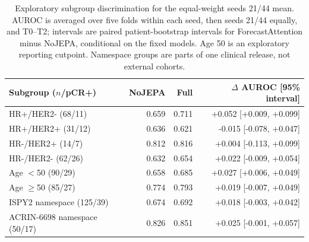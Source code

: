 \begin{table}[t]
\centering
\small
\caption{Exploratory subgroup discrimination for the equal-weight seeds 21/44 mean. AUROC is averaged over five folds within each seed, then seeds 21/44 equally, and T0--T2; intervals are paired patient-bootstrap intervals for ForecastAttention minus NoJEPA, conditional on the fixed models. Age 50 is an exploratory reporting cutpoint. Namespace groups are parts of one clinical release, not external cohorts.}
\label{tab:subgroups}
\begin{tabular}{lrrr}
\toprule
Subgroup ($n$/pCR+) & NoJEPA & Full & $\Delta$ AUROC [95\% interval] \\
\midrule
HR+/HER2- (68/11) & 0.659 & 0.711 & +0.052 [+0.009, +0.099] \\
HR+/HER2+ (31/12) & 0.636 & 0.621 & -0.015 [-0.078, +0.047] \\
HR-/HER2+ (14/7) & 0.812 & 0.816 & +0.004 [-0.113, +0.099] \\
HR-/HER2- (62/26) & 0.632 & 0.654 & +0.022 [-0.009, +0.054] \\
Age $<$50 (90/29) & 0.658 & 0.685 & +0.027 [+0.006, +0.049] \\
Age $\geq$50 (85/27) & 0.774 & 0.793 & +0.019 [-0.007, +0.049] \\
ISPY2 namespace (125/39) & 0.674 & 0.692 & +0.018 [-0.003, +0.042] \\
ACRIN-6698 namespace (50/17) & 0.826 & 0.851 & +0.025 [-0.001, +0.057] \\
\bottomrule
\end{tabular}
\end{table}
